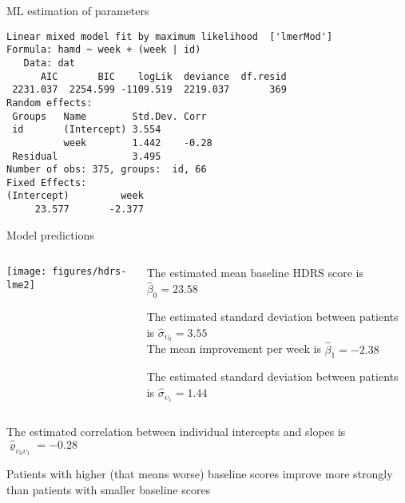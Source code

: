 \documentclass{beamer}
\begin{document}
\begin{frame}[fragile]{ML estimation of parameters}
\begin{lstlisting}
Linear mixed model fit by maximum likelihood  ['lmerMod']
Formula: hamd ~ week + (week | id)
   Data: dat
      AIC       BIC    logLik  deviance  df.resid 
 2231.037  2254.599 -1109.519  2219.037       369 
Random effects:
 Groups   Name        Std.Dev. Corr 
 id       (Intercept) 3.554         
          week        1.442    -0.28
 Residual             3.495         
Number of obs: 375, groups:  id, 66
Fixed Effects:
(Intercept)         week  
     23.577       -2.377  
\end{lstlisting}
\end{frame}


\begin{frame}{Model predictions}
\begin{columns}
\begin{column}{6cm}
\texttt{[image: figures/hdrs-lme2]}
\end{column}
%
\begin{column}{5cm}
  The estimated mean baseline HDRS score is $\hat{\beta}_0 = 23.58$

  The estimated standard deviation between patients is
  $\hat{\sigma}_{\upsilon_0} = 3.55$\\[2ex]

  The mean improvement per week is $\hat{\beta}_1 = -2.38$

  The estimated standard deviation between patients is
  $\hat{\sigma}_{\upsilon_1} = 1.44$\\[2ex]
\end{column}
\end{columns}
The estimated correlation between individual intercepts and slopes is
$\hat{\varrho}_{\upsilon_0 \upsilon_1} = -0.28$
  
  Patients with higher (that means worse) baseline scores improve more
  strongly than patients with smaller baseline scores
\end{frame}
\end{document}
